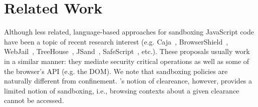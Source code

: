 \section{Related Work}
\label{sec:related}

Although less related, language-based approaches for sandboxing 
JavaScript code have been a topic of recent research interest
(e.g. Caja~\cite{GoogleCaja}, BrowserShield~\cite{Reis:2007}, WebJail~\cite{VanAcker:2011}, 
TreeHouse~\cite{Ingram:2012}, JSand~\cite{Agten:2012:JCC}, SafeScript~\cite{SafeScript}, etc.).
These proposals usually work in a similar manner: they mediate security critical
operations as well as some of the browser's API (e.g. the DOM). We note that
sandboxing policies are naturally different from confinement. \sys{}'s notion of
cleareance, however, provides a limited notion of sandboxing, i.e., browsing
contexts about a given clearance cannot be accessed.

 


